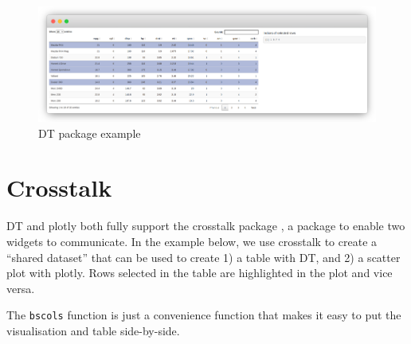 \documentclass[
]{krantz}
\makeatletter
\newenvironment{Shaded}{\begin{snugshade}}{\end{snugshade}}
\newcommand{\DataTypeTok}[1]{\textcolor[rgb]{0.27,0.27,0.27}{#1}}
\newcommand{\KeywordTok}[1]{\textcolor[rgb]{0.27,0.27,0.27}{\textbf{#1}}}
\newcommand{\NormalTok}[1]{#1}
\newcommand{\OperatorTok}[1]{\textcolor[rgb]{0.43,0.43,0.43}{\textbf{#1}}}
\newcommand{\StringTok}[1]{\textcolor[rgb]{0.5,0.5,0.5}{#1}}
\newenvironment{kframe}{%
\medskip{}
\setlength{\fboxsep}{.8em}
 \def\at@end@of@kframe{}%
 \ifinner\ifhmode%
  \def\at@end@of@kframe{\end{minipage}}%
  \begin{minipage}{\columnwidth}%
 \fi\fi%
 \def\FrameCommand##1{\hskip\@totalleftmargin \hskip-\fboxsep
 \colorbox{shadecolor}{##1}\hskip-\fboxsep
     \hskip-\linewidth \hskip-\@totalleftmargin \hskip\columnwidth}%
 \MakeFramed {\advance\hsize-\width
   \@totalleftmargin\z@ \linewidth\hsize
   \@setminipage}}%
 {\par\unskip\endMakeFramed%
 \at@end@of@kframe}
\renewenvironment{Shaded}{\begin{kframe}}{\end{kframe}}
\makeatother
\begin{document}
\begin{figure}[t]

{\centering \includegraphics[width=1\linewidth]{images/DT-example} 

}

\caption{DT package example}\label{fig:dt-example}
\end{figure}

\hypertarget{widgets-intro-crosstalk}{%
\section{Crosstalk}\label{widgets-intro-crosstalk}}

DT and plotly both fully support the crosstalk package \citep{R-crosstalk}, a package to enable two widgets to communicate. In the example below, we use crosstalk to create a ``shared dataset'' that can be used to create 1) a table with DT, and 2) a scatter plot with plotly. Rows selected in the table are highlighted in the plot and vice versa.

The \texttt{bscols} function is just a convenience function that makes it easy to put the visualisation and table side-by-side.

\begin{Shaded}
\end{Shaded}
\end{document}
